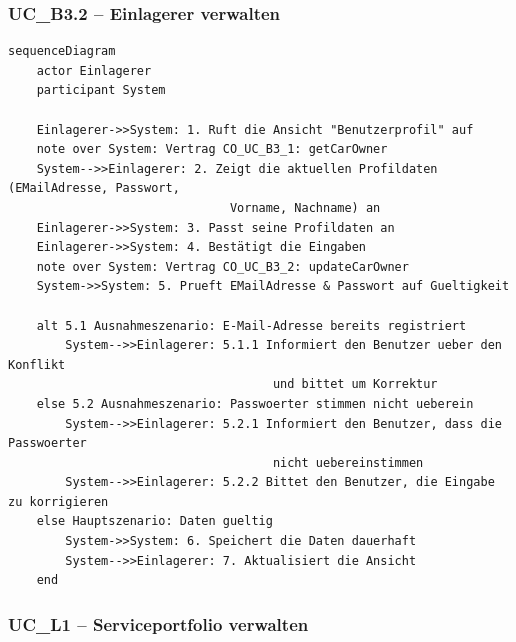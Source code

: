 \newpage

{}
\subsubsection*{UC\_B3.2 – Einlagerer verwalten}

\begin{lstlisting}[basicstyle=\ttfamily\small, breaklines=true]
sequenceDiagram
    actor Einlagerer
    participant System

    Einlagerer->>System: 1. Ruft die Ansicht "Benutzerprofil" auf
    note over System: Vertrag CO_UC_B3_1: getCarOwner
    System-->>Einlagerer: 2. Zeigt die aktuellen Profildaten (EMailAdresse, Passwort,
                               Vorname, Nachname) an
    Einlagerer->>System: 3. Passt seine Profildaten an
    Einlagerer->>System: 4. Bestätigt die Eingaben
    note over System: Vertrag CO_UC_B3_2: updateCarOwner
    System->>System: 5. Prueft EMailAdresse & Passwort auf Gueltigkeit

    alt 5.1 Ausnahmeszenario: E-Mail-Adresse bereits registriert
        System-->>Einlagerer: 5.1.1 Informiert den Benutzer ueber den Konflikt
                                     und bittet um Korrektur
    else 5.2 Ausnahmeszenario: Passwoerter stimmen nicht ueberein
        System-->>Einlagerer: 5.2.1 Informiert den Benutzer, dass die Passwoerter
                                     nicht uebereinstimmen
        System-->>Einlagerer: 5.2.2 Bittet den Benutzer, die Eingabe zu korrigieren
    else Hauptszenario: Daten gueltig
        System->>System: 6. Speichert die Daten dauerhaft
        System-->>Einlagerer: 7. Aktualisiert die Ansicht
    end
\end{lstlisting}

\newpage

{}
\subsubsection*{UC\_L1 – Serviceportfolio verwalten}


